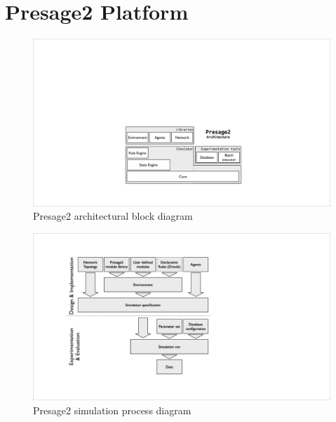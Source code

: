 


\section{Presage2 Platform}



\begin{figure}
\includegraphics[width=\linewidth]{gfx/presage2/architecture_block}
\caption{Presage2 architectural block diagram}\label{fig:presage2block}
\end{figure}

\begin{figure}
\includegraphics[width=\linewidth]{gfx/presage2/simulation_process}
\caption{Presage2 simulation process diagram}\label{fig:presage2block}
\end{figure}


